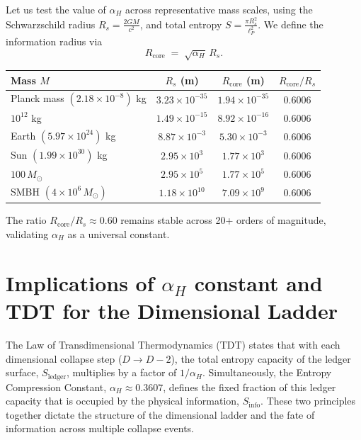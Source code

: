 \documentclass[a4paper, 12pt, oneside]{book}
\numberwithin{equation}{chapter}
\begin{document}
Let us test the value of $\alpha_H$ across representative mass scales,
using the Schwarzschild radius
\( R_s = \frac{2GM}{c^2} \),
and total entropy
\( S = \frac{\pi R_s^2}{\ell_P^2} \).
We define the information radius via
\[
    R_{\text{core}} \;=\; \sqrt{\alpha_H}\,R_s.
\]
\begin{center}
\renewcommand{\arraystretch}{1.4}
\begin{tabular}{lccc}
\toprule
\textbf{Mass $M$} &
\textbf{$R_s$ (m)} &
\textbf{$R_{\text{core}}$ (m)} &
\textbf{$R_{\text{core}}/R_s$} \\
\midrule
Planck mass $(2.18\!\times\!10^{-8})$ kg
 & $3.23\times 10^{-35}$ & $1.94\times 10^{-35}$ & 0.6006 \\
$10^{12}$ kg
 & $1.49\times 10^{-15}$ & $8.92\times 10^{-16}$ & 0.6006 \\
Earth $(5.97\!\times\!10^{24})$ kg
 & $8.87\times 10^{-3}$ & $5.30\times 10^{-3}$ & 0.6006 \\
Sun $(1.99\!\times\!10^{30})$ kg
 & $2.95\times 10^{3}$ & $1.77\times 10^{3}$ & 0.6006 \\
$100\,M_\odot$
 & $2.95\times 10^{5}$ & $1.77\times 10^{5}$ & 0.6006 \\
SMBH $(4\times 10^6\,M_\odot)$
 & $1.18\times 10^{10}$ & $7.09\times 10^{9}$ & 0.6006 \\
\bottomrule
\end{tabular}
\end{center}

\noindent
The ratio \( R_{\text{core}}/R_s \approx 0.60 \) remains stable across
20+ orders of magnitude, validating $\alpha_H$ as a universal constant.

\section[Implications of \texorpdfstring{$\alpha_H$}{alphaH} and TDT ]{Implications of \texorpdfstring{$\alpha_H$}{alphaH} constant and TDT for the Dimensional Ladder}
\label{app:ScalingLaw}

The Law of Transdimensional Thermodynamics (TDT) states that with each dimensional collapse step ($D \to D-2$), the total entropy capacity of the ledger surface, $S_{\text{ledger}}$, multiplies by a factor of $1/\alpha_H$. Simultaneously, the Entropy Compression Constant, $\alpha_H \approx 0.3607$, defines the fixed fraction of this ledger capacity that is occupied by the physical information, $S_{\text{info}}$. These two principles together dictate the structure of the dimensional ladder and the fate of information across multiple collapse events.
\end{document}
